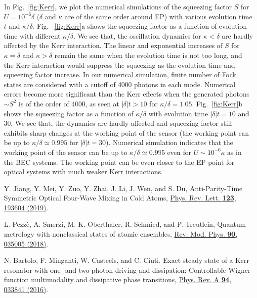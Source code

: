 \documentclass[twocolumn,prl,floatfix,citeautoscript,nofootinbib,superscriptaddress]{revtex4}
\begin{document}
\begin{widetext}
In Fig.~\ref{fig:Kerr}, we plot the numerical simulations of the squeezing
factor $S$ for $U=10^{-6}\delta $ ($\delta $ and $\kappa $ are of the same
order around EP) with various evolution time $t$ and $\kappa /\delta $. Fig.~%
\ref{fig:Kerr}a shows the squeezing factor as a function of evolution time
with different $\kappa /\delta $. We see that, the oscillation dynamics for $%
\kappa <\delta $ are hardly affected by the Kerr interaction. The linear and
exponential increases of $S$ for $\kappa =\delta $ and $\kappa >\delta $
remain the same when the evolution time is not too long, and the Kerr
interaction would suppress the squeezing as the evolution time and squeezing
factor increase. In our numerical simulation, finite number of Fock states
are considered with a cutoff of 4000 photons in each mode. Numerical errors
become more significant than the Kerr effects when the generated photons $%
\sim S^{2}$ is of the order of 4000, as seen at $|\delta |t>10$ for $\kappa
/\delta =1.05$. Fig.~\ref{fig:Kerr}b shows the squeezing factor as a
function of $\kappa /\delta $ with evolution time $|\delta |t=10$ and $30$.
We see that, the dynamics are hardly affected and squeezing factor still
exhibits sharp changes at the working point of the sensor (the working point
can be up to $\kappa /\delta \simeq 0.995$ for $|\delta |t=30$). Numerical
simulation indicates that the working point of the sensor can be up to $%
\kappa /\delta \simeq 0.995$ even for $U\sim 10^{-6}\kappa $ as in the BEC
systems. The working point can be even closer to the EP point for optical
systems with much weaker Kerr interactions.

\begin{thebibliography}{99}
 Y. Jiang, Y. Mei, Y. Zuo, Y. Zhai, J. Li,
J. Wen, and S. Du, Anti-Parity-Time Symmetric Optical Four-Wave Mixing in
Cold Atoms, \href{https://doi.org/10.1103/PhysRevLett.123.193604}{Phys. Rev.
Lett. \textbf{123}, 193604 (2019)}.

 L. Pezz\`e, A. Smerzi, M. K. Oberthaler, R.
Schmied, and P. Treutlein, Quantum metrology with nonclassical states of
atomic ensembles, \href{https://doi.org/10.1103/RevModPhys.90.035005}{Rev.
Mod. Phys. \textbf{90}, 035005 (2018)}.

 N. Bartolo, F. Minganti, W. Casteels, and C.
Ciuti, Exact steady state of a Kerr resonator with one- and two-photon
driving and dissipation: Controllable Wigner-function multimodality and
dissipative phase transitions, \href{https://doi.org/10.1103/PhysRevA.94.033841}%
{Phys. Rev. A \textbf{94}, 033841 (2016)}.


\end{thebibliography}
\end{widetext}
\end{document}
